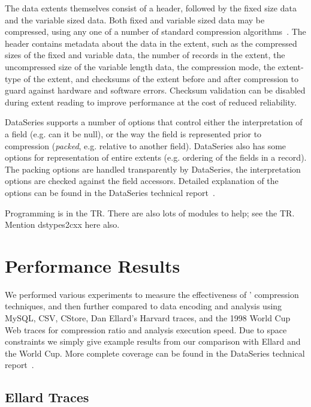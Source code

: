 \documentclass{acm_proc_article-sp}
\begin{document}
The data extents themselves consist of a header, followed by the fixed
size data and the variable sized data.  Both fixed and variable sized
data may be compressed, using any one of a number of standard
compression algorithms~\cite{GZIP,BZIP,LZF,LZO}.  The header contains
metadata about the data in the extent, such as the compressed sizes of
the fixed and variable data, the number of records in the extent, the
uncompressed size of the variable length data, the compression mode,
the extent-type of the extent, and checksums of the extent before and
after compression to guard against hardware and software errors.
Checksum validation can be disabled during extent reading to improve
performance at the cost of reduced reliability.

DataSeries supports a number of options that control either the
interpretation of a field (e.g. can it be null), or the way the field
is represented prior to compression ({\em packed}, e.g. relative to
another field).  DataSeries also has some options for representation
of entire extents (e.g. ordering of the fields in a record).  The
packing options are handled transparently by DataSeries, the
interpretation options are checked against the field accessors.
Detailed explanation of the options can be found in the DataSeries
technical report~\cite{DSTechnicalReportSnapshot}.

Programming is in the TR.  There are also lots of modules to help; see
the TR.  Mention dstypes2cxx here also.

\section{Performance Results}\label{sec:results}

We performed various experiments to measure the effectiveness of
\DataSeries{}' compression techniques, and then further compared \DataSeries{} to data encoding and analysis using MySQL, CSV, CStore, Dan Ellard's Harvard traces\cite{ellard03}, and the 1998 World Cup Web traces\cite{ita08} for compression ratio and analysis execution speed.  Due to space constraints we simply give example results
from our comparison with Ellard and the World Cup.  More complete coverage can be found in the DataSeries technical report~\cite{DSTechnicalReportSnapshot}.


\subsection{Ellard Traces}\label{sec:ellard}
\end{document}
